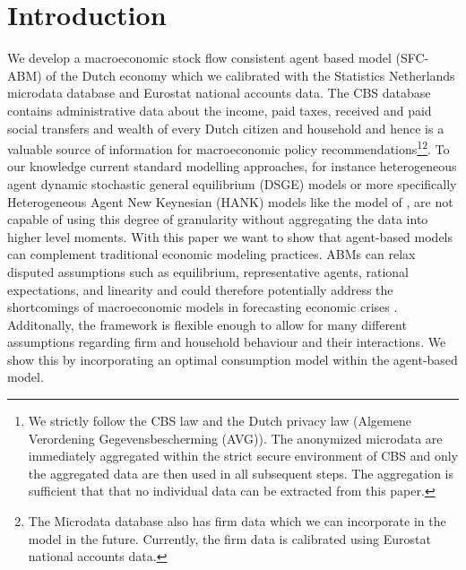
\section{Introduction} %

\label{ChapterX} %

We develop a macroeconomic stock flow consistent agent based model (SFC-ABM) of the Dutch economy which we calibrated with the Statistics Netherlands microdata database and Eurostat national accounts data. The CBS database contains administrative data about the income, paid taxes, received and paid social transfers and wealth of every Dutch citizen and household and hence is a valuable source of information for macroeconomic policy recommendations\footnote{We strictly follow the CBS law and the Dutch privacy law (Algemene Verordening Gegevensbescherming (AVG)). The anonymized microdata are immediately aggregated within the strict secure environment of CBS and only the aggregated data are then used in all subsequent steps. The aggregation is sufficient that that no individual data can be extracted from this paper.}\footnote{The Microdata database also has firm data which we can incorporate in the model in the future. Currently, the firm data is calibrated using Eurostat national accounts data.}. To our knowledge current standard modelling approaches, for instance heterogeneous agent dynamic stochastic general equilibrium (DSGE) models or more specifically Heterogeneous Agent New Keynesian (HANK) models like the model of \cite{kaplan_monetary_2018}, are not capable of using this degree of granularity without aggregating the data into higher level moments. With this paper we want to show that agent-based models can complement traditional economic modeling practices. ABMs can relax disputed assumptions such as equilibrium, representative agents, rational expectations, and linearity and could therefore potentially address the shortcomings of macroeconomic models in forecasting economic crises \citep{fagiolo_macroeconomic_2017}. Additonally, the framework is flexible enough to allow for many different assumptions regarding firm and household behaviour and their interactions. We show this by incorporating an optimal consumption model within the agent-based model.\\

